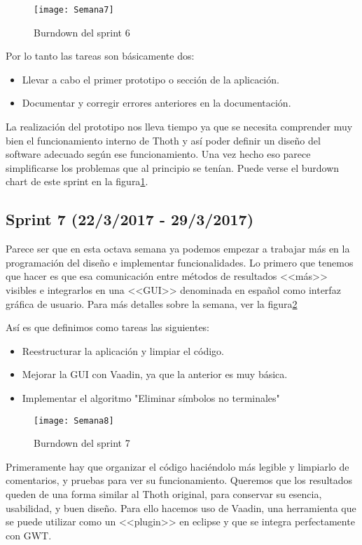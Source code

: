 \begin{figure}[h]
\centering
\texttt{[image: Semana7]}
\caption{Burndown del sprint 6}
\label{fig:A.5}
\end{figure}

Por lo tanto las tareas son básicamente dos:

\begin{itemize}
\item Llevar a cabo el primer prototipo o sección de la aplicación.
\item Documentar y corregir errores anteriores en la documentación.
\end{itemize}

La realización del prototipo nos lleva tiempo ya que se necesita comprender muy bien el funcionamiento interno de Thoth y así poder definir un diseño del software adecuado según ese funcionamiento. Una vez hecho eso parece simplificarse los problemas que al principio se tenían. Puede verse el burdown chart de este sprint en la figura\ref{fig:A.5}.

\subsection{Sprint 7 (22/3/2017 - 29/3/2017)}

Parece ser que en esta octava semana ya podemos empezar a trabajar más en la programación del diseño e implementar funcionalidades. Lo primero que tenemos que hacer es que esa comunicación entre métodos de resultados <<más>> visibles e integrarlos en una <<GUI>> denominada en español como interfaz gráfica de usuario. Para más detalles sobre la semana, ver la figura\ref{fig:A.6}

Así es que definimos como tareas las siguientes:

\begin{itemize}
\item Reestructurar la aplicación y limpiar el código.
\item Mejorar la GUI con Vaadin, ya que la anterior es muy básica.
\item Implementar el algoritmo "Eliminar símbolos no terminales"
\end{itemize}

\begin{figure}[h]
\centering
\texttt{[image: Semana8]}
\caption{Burndown del sprint 7}
\label{fig:A.6}
\end{figure}

Primeramente hay que organizar el código haciéndolo más legible y limpiarlo de comentarios, y pruebas para ver su funcionamiento. Queremos que los resultados queden de una forma similar al Thoth original, para conservar su esencia, usabilidad, y buen diseño. Para ello hacemos uso de Vaadin, una herramienta que se puede utilizar como un <<plugin>> en eclipse y que se integra perfectamente con GWT.

